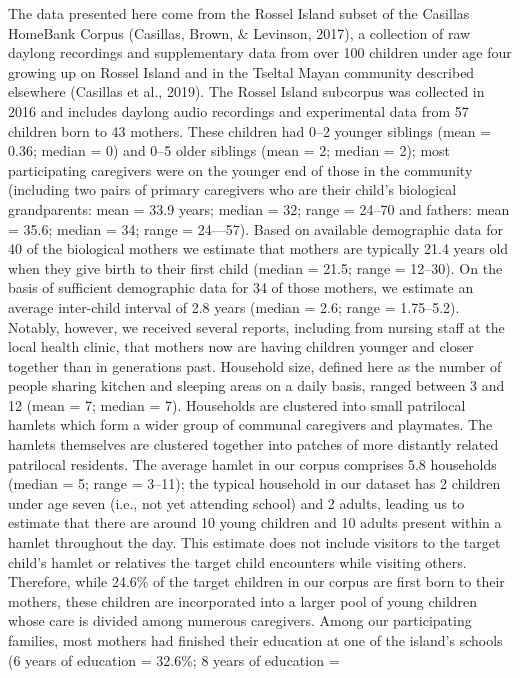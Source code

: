 \documentclass[,man,mask,floatsintext]{apa6}
\begin{document}
The data presented here come from the Rossel Island subset of the
Casillas HomeBank Corpus (Casillas, Brown, \& Levinson, 2017), a
collection of raw daylong recordings and supplementary data from over
100 children under age four growing up on Rossel Island and in the
Tseltal Mayan community described elsewhere (Casillas et al., 2019). The
Rossel Island subcorpus was collected in 2016 and includes daylong audio
recordings and experimental data from 57 children born to 43 mothers.
These children had 0--2 younger siblings (mean = 0.36; median = 0) and
0--5 older siblings (mean = 2; median = 2); most participating
caregivers were on the younger end of those in the community (including
two pairs of primary caregivers who are their child's biological
grandparents: mean = 33.9 years; median = 32; range = 24--70 and
fathers: mean = 35.6; median = 34; range = 24---57). Based on available
demographic data for 40 of the biological mothers we estimate that
mothers are typically 21.4 years old when they give birth to their first
child (median = 21.5; range = 12--30). On the basis of sufficient
demographic data for 34 of those mothers, we estimate an average
inter-child interval of 2.8 years (median = 2.6; range = 1.75--5.2).
Notably, however, we received several reports, including from nursing
staff at the local health clinic, that mothers now are having children
younger and closer together than in generations past. Household size,
defined here as the number of people sharing kitchen and sleeping areas
on a daily basis, ranged between 3 and 12 (mean = 7; median = 7).
Households are clustered into small patrilocal hamlets which form a
wider group of communal caregivers and playmates. The hamlets themselves
are clustered together into patches of more distantly related patrilocal
residents. The average hamlet in our corpus comprises 5.8 households
(median = 5; range = 3--11); the typical household in our dataset has 2
children under age seven (i.e., not yet attending school) and 2 adults,
leading us to estimate that there are around 10 young children and 10
adults present within a hamlet throughout the day. This estimate does
not include visitors to the target child's hamlet or relatives the
target child encounters while visiting others. Therefore, while 24.6\%
of the target children in our corpus are first born to their mothers,
these children are incorporated into a larger pool of young children
whose care is divided among numerous caregivers. Among our participating
families, most mothers had finished their education at one of the
island's schools (6 years of education = 32.6\%; 8 years of education =
\end{document}
